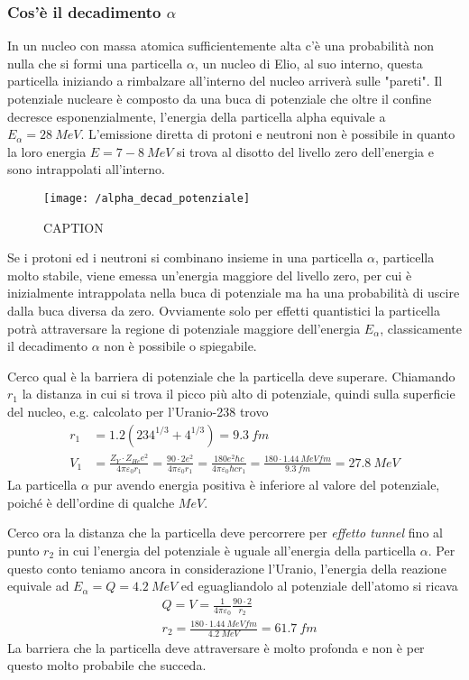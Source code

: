 \subsubsection{Cos'è il decadimento $\alpha$}
In un nucleo con massa atomica sufficientemente alta c'è una probabilità non nulla che si formi una particella $\alpha$, un nucleo di Elio, al suo interno, questa particella iniziando a rimbalzare all'interno del nucleo arriverà sulle "pareti".
Il potenziale nucleare è composto da una buca di potenziale che oltre il confine decresce esponenzialmente, l'energia della particella alpha equivale a $E_{\alpha} = \SI{28}{MeV}$.
L'emissione diretta di protoni e neutroni non è possibile in quanto la loro energia $E= 7-\SI{8}{MeV}$ si trova al disotto del livello zero dell'energia e sono intrappolati all'interno.
\begin{figure}[h]
\centering
\texttt{[image: /alpha\_decad\_potenziale]}
\caption{CAPTION}
\end{figure}
Se i protoni ed i neutroni si combinano insieme in una particella $\alpha$, particella molto stabile, viene emessa un'energia maggiore del livello zero, per cui è inizialmente intrappolata nella buca di potenziale ma ha una probabilità di uscire dalla buca diversa da zero.
Ovviamente solo per effetti quantistici la particella potrà attraversare la regione di potenziale maggiore dell'energia $E_{\alpha}$, classicamente il decadimento $\alpha$ non è possibile o spiegabile.

Cerco qual è la barriera di potenziale che la particella deve superare.
Chiamando $r_1$ la distanza in cui si trova il picco più alto di potenziale, quindi sulla superficie del nucleo, e.g. calcolato per l'Uranio-238 trovo
\begin{equation}
\begin{split}
r_1 & = 1.2 ( 234^{1/3} + 4^{1/3} ) = \SI{9.3}{fm} \\
V_1 & = \frac{ Z_Y \cdot Z_{He} e^2}{4 \pi \varepsilon_0 r_1} = \frac{ 90 \cdot 2 e^2}{4 \pi \varepsilon_0 r_1} = \frac{180 e^2 \hbar c }{4 \pi \varepsilon_0 \hbar c r_1} = \frac{180 \cdot \SI{1.44 }{MeV fm}}{ \SI{9.3}{fm} } =  \SI{27.8}{MeV} 
\end{split}
\end{equation}
La particella $\alpha$ pur avendo energia positiva è inferiore al valore del potenziale, poiché è dell'ordine di qualche $MeV$. 

Cerco ora la distanza che la particella deve percorrere per \emph{effetto tunnel} fino al punto $r_2$ in cui l'energia del potenziale è uguale all'energia della particella $\alpha$.
Per questo conto teniamo ancora in considerazione l'Uranio, l'energia della reazione equivale ad $E_{\alpha} = Q = \SI{4.2}{MeV}$ ed eguagliandolo al potenziale dell'atomo si ricava
\begin{equation}
\begin{split}
& Q = V = \frac{1}{4 \pi \varepsilon_0} \frac{90\cdot2}{r_2} \\
& r_2 = \frac{180 \cdot \SI{1.44}{MeV fm}}{\SI{4.2}{MeV}} = \SI{61.7}{fm}
\end{split}
\end{equation}
La barriera che la particella deve attraversare è molto profonda e non è per questo molto probabile che succeda.



